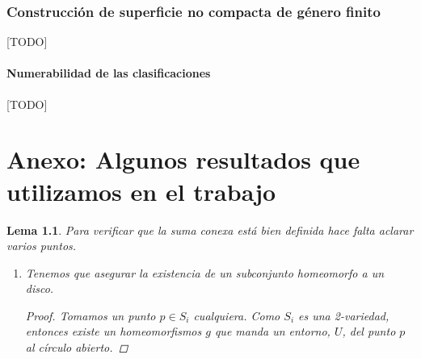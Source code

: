 \documentclass[a4paper,11pt,spanish, twoside, leqno]{tfg-uam}
\newtheorem{lema}[teor]{Lema}
\theoremstyle{definition}
\begin{document}
\subsection{Construcción de superficie no compacta de género finito}
[TODO]
\subsubsection*{Numerabilidad de las clasificaciones}
[TODO]




\chapter{Anexo: Algunos resultados que utilizamos en el trabajo}

\begin{lema}\label{lema:sumaconexa}
	Para verificar que la suma conexa está bien definida hace falta aclarar varios puntos.
	\begin{enumerate}
		\item 
		Tenemos que asegurar la existencia de un subconjunto homeomorfo a un disco.
		\begin{proof}
			Tomamos un punto $p\in S_i$ cualquiera. Como $S_i$ es una 2-variedad, entonces existe un homeomorfismos $g$ que manda un entorno, $U$, del punto $p$ al círculo abierto. 
			

\end{proof}
\end{enumerate}
\end{lema}
\end{document}
